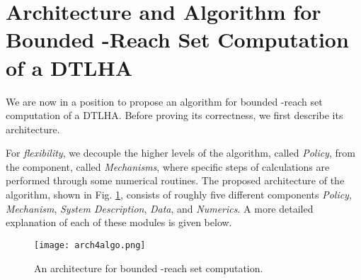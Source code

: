 \section{Architecture and Algorithm for Bounded -Reach Set Computation of a DTLHA}  \label{sec:design}

We are now in a position to propose an algorithm for bounded -reach set computation of a DTLHA.
Before proving its correctness, we first describe its architecture.



For \emph{flexibility}, we decouple the higher levels of the algorithm, called \emph{Policy}, from the component, called \emph{Mechanisms}, where specific steps of calculations are performed through some numerical routines.
The proposed architecture of the algorithm, shown in Fig. \ref{fig:arch}, consists of roughly five different components \emph{Policy}, \emph{Mechanism}, \emph{System Description}, \emph{Data}, and \emph{Numerics}.
A more detailed explanation of each of these modules is given below. 


\begin{figure}
\begin{center}
\texttt{[image: arch4algo.png]} 	\caption{An architecture for bounded -reach set computation.}
\label{fig:arch}
\end{center}
\end{figure}


